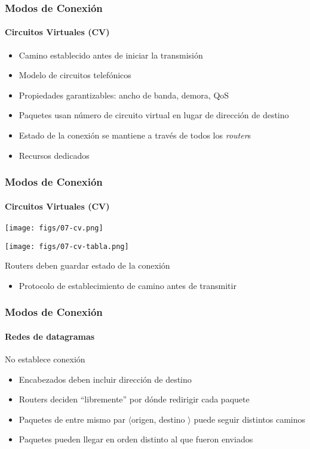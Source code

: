 \documentclass[letter]{beamer}
\begin{document}
\begin{frame}
  \frametitle{Modos de Conexión}
  \framesubtitle{Circuitos Virtuales (CV)}
  
  \begin{itemize}
    \item Camino establecido antes de iniciar la transmisión
    \item Modelo de circuitos telefónicos
    \item Propiedades garantizables: ancho de banda, demora, QoS
    \item Paquetes usan número de circuito virtual en lugar de dirección de destino
    \item Estado de la conexión se mantiene a través de todos los {\em router}s
    \item Recursos dedicados
  \end{itemize}

\end{frame}
\begin{frame}
  \frametitle{Modos de Conexión}
  \framesubtitle{Circuitos Virtuales (CV)}

  \begin{center}
    \texttt{[image: figs/07-cv.png]}
  \end{center}

  \begin{center}
    \texttt{[image: figs/07-cv-tabla.png]}
  \end{center}

  Routers deben guardar estado de la conexión
  \begin{itemize}
    \item Protocolo de establecimiento de camino antes de transmitir
  \end{itemize}

\end{frame}
\begin{frame}
  \frametitle{Modos de Conexión}
  \framesubtitle{Redes de datagramas}

  No establece conexión
  \begin{itemize}
    \item Encabezados deben incluir dirección de destino
    \item Routers deciden ``libremente'' por dónde redirigir cada paquete
    \item Paquetes de entre mismo par $\langle$origen, destino $\rangle$ puede seguir
          distintos caminos
    \item Paquetes pueden llegar en orden distinto al que fueron enviados
  \end{itemize}
\end{frame}  
  
\end{document}

